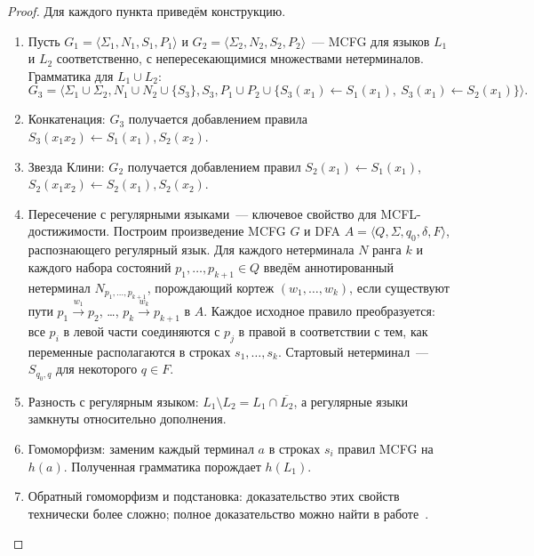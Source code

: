 \begin{proof}
    Для каждого пункта приведём конструкцию.

    \begin{enumerate}
        \item Пусть $G_1 = \langle \Sigma_1, N_1, S_1, P_1 \rangle$ и $G_2 = \langle \Sigma_2, N_2, S_2, P_2 \rangle$~--- MCFG для языков $L_1$ и $L_2$ соответственно, с непересекающимися множествами нетерминалов. Грамматика для $L_1 \cup L_2$:
              \[
              G_3 = \langle \Sigma_1 \cup \Sigma_2, N_1 \cup N_2 \cup \{S_3\}, S_3, P_1 \cup P_2 \cup \{ S_3(x_1) \leftarrow S_1(x_1),\ S_3(x_1) \leftarrow S_2(x_1) \} \rangle.
              \]

        \item Конкатенация: $G_3$ получается добавлением правила $S_3(x_1 x_2) \leftarrow S_1(x_1), S_2(x_2)$.

        \item Звезда Клини: $G_2$ получается добавлением правил $S_2(x_1) \leftarrow S_1(x_1)$, $S_2(x_1 x_2) \leftarrow S_2(x_1), S_2(x_2)$.

        \item Пересечение с регулярными языками~--- ключевое свойство для MCFL-достижимости. Построим произведение MCFG $G$ и DFA $A = \langle Q, \Sigma, q_0, \delta, F \rangle$, распознающего регулярный язык. Для каждого нетерминала $N$ ранга $k$ и каждого набора состояний $p_1,\ldots,p_{k+1} \in Q$ введём аннотированный нетерминал $N_{p_1,\ldots,p_{k+1}}$, порождающий кортеж $(w_1,\ldots,w_k)$, если существуют пути $p_1 \xrightarrow{w_1} p_2$, \ldots, $p_k \xrightarrow{w_k} p_{k+1}$ в $A$. Каждое исходное правило преобразуется: все $p_i$ в левой части соединяются с $p_j$ в правой в соответствии с тем, как переменные располагаются в строках $s_1,\ldots,s_k$. Стартовый нетерминал~--- $S_{q_0, q}$ для некоторого $q \in F$.

        \item Разность с регулярным языком: $L_1 \setminus L_2 = L_1 \cap \overline{L_2}$, а регулярные языки замкнуты относительно дополнения.
        \item Гомоморфизм: заменим каждый терминал $a$ в строках $s_i$ правил MCFG на $h(a)$. Полученная грамматика порождает $h(L_1)$.

        \item Обратный гомоморфизм и подстановка: доказательство этих свойств технически более сложно; полное доказательство можно найти в работе~.
    \end{enumerate}
\end{proof}

